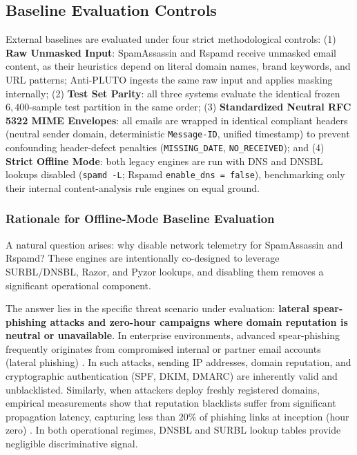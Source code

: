 \documentclass[journal]{IEEEtran}
\begin{document}
\subsection{Baseline Evaluation Controls}
External baselines are evaluated under four strict methodological controls: (1) \textbf{Raw Unmasked Input}: SpamAssassin and Rspamd receive unmasked email content, as their heuristics depend on literal domain names, brand keywords, and URL patterns; Anti-PLUTO ingests the same raw input and applies masking internally; (2) \textbf{Test Set Parity}: all three systems evaluate the identical frozen $6{,}400$-sample test partition in the same order; (3) \textbf{Standardized Neutral RFC 5322 MIME Envelopes}: all emails are wrapped in identical compliant headers (neutral sender domain, deterministic \texttt{Message-ID}, unified timestamp) to prevent confounding header-defect penalties (\texttt{MISSING\_DATE}, \texttt{NO\_RECEIVED}); and (4) \textbf{Strict Offline Mode}: both legacy engines are run with DNS and DNSBL lookups disabled (\texttt{spamd -L}; Rspamd \texttt{enable\_dns = false}), benchmarking only their internal content-analysis rule engines on equal ground.

\subsubsection{Rationale for Offline-Mode Baseline Evaluation}
A natural question arises: why disable network telemetry for SpamAssassin and Rspamd? These engines are intentionally co-designed to leverage SURBL/DNSBL, Razor, and Pyzor lookups, and disabling them removes a significant operational component.

The answer lies in the specific threat scenario under evaluation: \textbf{lateral spear-phishing attacks and zero-hour campaigns where domain reputation is neutral or unavailable}. In enterprise environments, advanced spear-phishing frequently originates from compromised internal or partner email accounts (lateral phishing) \cite{ho2019detecting, bethany2025}. In such attacks, sending IP addresses, domain reputation, and cryptographic authentication (SPF, DKIM, DMARC) are inherently valid and unblacklisted. Similarly, when attackers deploy freshly registered domains, empirical measurements show that reputation blacklists suffer from significant propagation latency, capturing less than $20\%$ of phishing links at inception (hour zero) \cite{sheng2009empirical}. In both operational regimes, DNSBL and SURBL lookup tables provide negligible discriminative signal.
\end{document}
